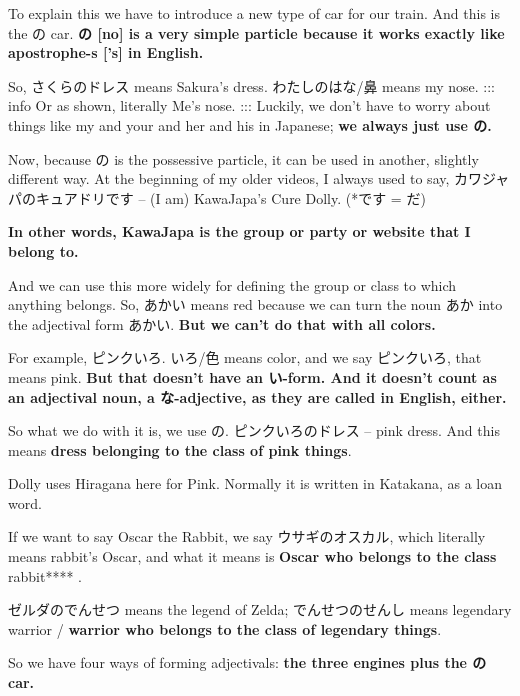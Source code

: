 To explain this we have to introduce a new type of car for our train. And this is the の car. {\bf の {[}no{]} is a very simple particle because it works exactly like apostrophe-s {[}'s{]} in English.}

{}

So, さくらのドレス means Sakura's dress. わたしのはな/鼻 means my nose. ::: info Or as shown, literally Me's nose. ::: Luckily, we don't have to worry about things like my and your and her and his in Japanese; {\bf we always just use の.}

\thinrule

Now, because の is the possessive particle, it can be used in another, slightly different way. At the beginning of my older videos, I always used to say, カワジャパのキュアドリです -- (I am) KawaJapa's Cure Dolly. (*です = だ)

{\bf In other words, KawaJapa is the group or party or website that I belong to.}

And we can use this more widely for defining the group or class to which anything belongs. So, あかい means red because we can turn the noun あか into the adjectival form あかい. {\bf But we can't do that with all colors.}

For example, ピンクいろ. いろ/色 means color, and we say ピンクいろ, that means pink. {\bf But that doesn't have an い-form. And it doesn't count as an adjectival noun, a な-adjective, as they are called in English, either.}

So what we do with it is, we use の. ピンクいろのドレス -- pink dress. And this means {\bf dress belonging to the class of pink things}.

{}

Dolly uses Hiragana here for Pink. Normally it is written in Katakana, as a loan word.

If we want to say Oscar the Rabbit, we say ウサギのオスカル, which literally means rabbit's Oscar, and what it means is {\bf Oscar who belongs to the class }rabbit**** .

{}

ゼルダのでんせつ means the legend of Zelda; でんせつのせんし means legendary warrior / {\bf warrior who belongs to the class of legendary things}.

{}

So we have four ways of forming adjectivals: {\bf the three engines plus the の car.}

